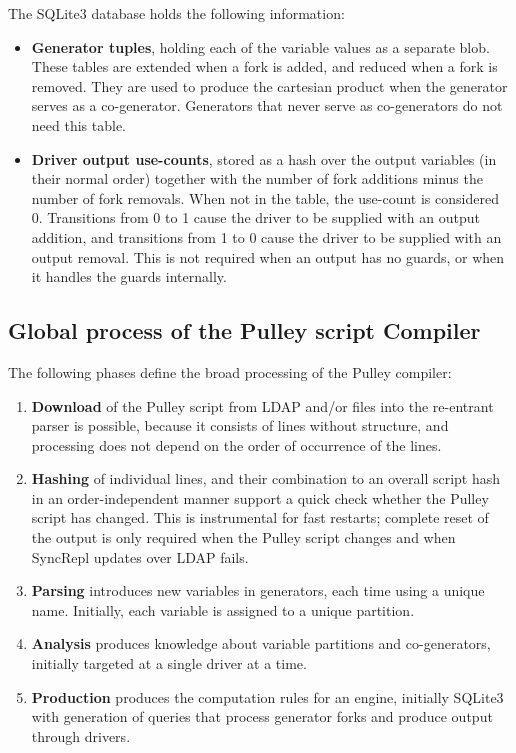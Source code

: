 \documentclass[a4paper]{article}
\begin{document}
The SQLite3 database holds the following information:

\begin{itemize}
\item\textbf{Generator tuples}, holding each of the variable values as a separate blob.  These tables are extended when a fork is added, and reduced when a fork is removed.  They are used to produce the cartesian product when the generator serves as a co-generator.  Generators that never serve as co-generators do not need this table.
\item\textbf{Driver output use-counts}, stored as a hash over the output variables (in their normal order) together with the number of fork additions minus the number of fork removals.  When not in the table, the use-count is considered 0.  Transitions from 0 to 1 cause the driver to be supplied with an output addition, and transitions from 1 to 0 cause the driver to be supplied with an output removal.  This is not required when an output has no guards, or when it handles the guards internally.
\end{itemize}

\subsection{Global process of the Pulley script Compiler}

The following phases define the broad processing of the Pulley compiler:

\begin{enumerate}
\item\textbf{Download} of the Pulley script from LDAP and/or files into the re-entrant parser is possible, because it consists of lines without structure, and processing does not depend on the order of occurrence of the lines.
\item\textbf{Hashing} of individual lines, and their combination to an overall script hash in an order-independent manner support a quick check whether the Pulley script has changed.  This is instrumental for fast restarts; complete reset of the output is only required when the Pulley script changes and when SyncRepl updates over LDAP fails.
\item\textbf{Parsing} introduces new variables in generators, each time using a unique name.  Initially, each variable is assigned to a unique partition.
\item\textbf{Analysis} produces knowledge about variable partitions and co-generators, initially targeted at a single driver at a time.
\item\textbf{Production} produces the computation rules for an engine, initially SQLite3 with generation of queries that process generator forks and produce output through drivers.
\end{enumerate}
\end{document}
